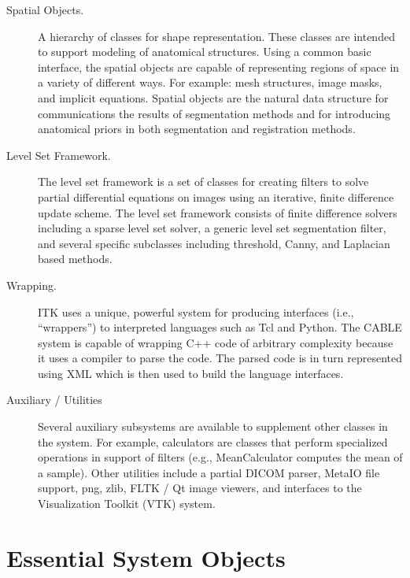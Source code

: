 \begin{description}
	\item[Spatial Objects.] A hierarchy of classes for shape
        representation.  These classes are intended to support modeling of
        anatomical structures. Using a common basic interface, the spatial
        objects are capable of representing regions of space in a variety of
        different ways. For example: mesh structures, image masks, and
        implicit equations.  Spatial objects are the natural data structure
        for communications the results of segmentation methods and for
        introducing anatomical priors in both segmentation and registration
        methods.

	\item[Level Set Framework.] The level set framework is a set of
        classes for creating filters to solve partial differential equations
        on images using an iterative, finite difference update scheme. The
        level set framework consists of finite difference solvers including a
        sparse level set solver, a generic level set segmentation filter, and
        several specific subclasses including threshold, Canny, and Laplacian
        based methods.

	\item[Wrapping.] ITK uses a unique, powerful system for producing
        interfaces (i.e., ``wrappers'') to interpreted languages such as Tcl
        and Python. The CABLE system is capable of wrapping C++ code of
        arbitrary complexity because it uses a compiler to parse the code.
        The parsed code is in turn represented using XML which is then
        used to build the language interfaces.

	\item[Auxiliary / Utilities] Several auxiliary subsystems are 
        available to supplement other classes in the system. For example,
        calculators are classes that perform specialized operations in
        support of filters (e.g., MeanCalculator computes the mean of a
        sample). Other utilities include a partial DICOM parser, MetaIO file
        support, png, zlib, FLTK / Qt image viewers, and interfaces to the
        Visualization Toolkit (VTK) system.
        
\end{description}


\section{Essential System Objects}
\label{sec:EssentialSystemObjects}


